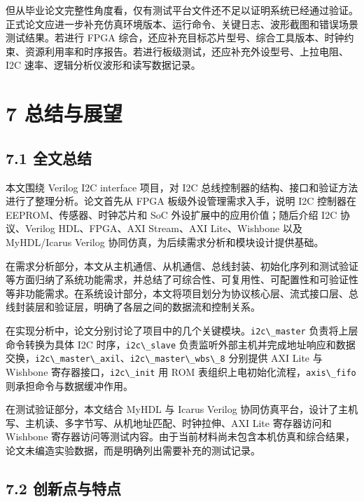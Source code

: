 但从毕业论文完整性角度看，仅有测试平台文件还不足以证明系统已经通过验证。正式论文应进一步补充仿真环境版本、运行命令、关键日志、波形截图和错误场景测试结果。若进行
FPGA
综合，还应补充目标芯片型号、综合工具版本、时钟约束、资源利用率和时序报告。若进行板级测试，还应补充外设型号、上拉电阻、I2C
速率、逻辑分析仪波形和读写数据记录。

\section{7 总结与展望}\label{ux603bux7ed3ux4e0eux5c55ux671b}

\subsection{7.1 全文总结}\label{ux5168ux6587ux603bux7ed3}

本文围绕 Verilog I2C interface 项目，对 I2C
总线控制器的结构、接口和验证方法进行了整理分析。论文首先从 FPGA
板级外设管理需求入手，说明 I2C 控制器在 EEPROM、传感器、时钟芯片和 SoC
外设扩展中的应用价值；随后介绍 I2C 协议、Verilog HDL、FPGA、AXI
Stream、AXI Lite、Wishbone 以及 MyHDL/Icarus Verilog
协同仿真，为后续需求分析和模块设计提供基础。

在需求分析部分，本文从主机通信、从机通信、总线封装、初始化序列和测试验证等方面归纳了系统功能需求，并总结了可综合性、可复用性、可配置性和可验证性等非功能需求。在系统设计部分，本文将项目划分为协议核心层、流式接口层、总线封装层和验证层，明确了各层之间的数据流和控制关系。

在实现分析中，论文分别讨论了项目中的几个关键模块。\passthrough{\lstinline!i2c\_master!}
负责将上层命令转换为具体 I2C 时序，\passthrough{\lstinline!i2c\_slave!}
负责监听外部主机并完成地址响应和数据交换，\passthrough{\lstinline!i2c\_master\_axil!}、\passthrough{\lstinline!i2c\_master\_wbs\_8!}
分别提供 AXI Lite 与 Wishbone
寄存器接口，\passthrough{\lstinline!i2c\_init!} 用 ROM
表组织上电初始化流程，\passthrough{\lstinline!axis\_fifo!}
则承担命令与数据缓冲作用。

在测试验证部分，本文结合 MyHDL 与 Icarus Verilog
协同仿真平台，设计了主机写、主机读、多字节写、从机地址匹配、时钟拉伸、AXI
Lite 寄存器访问和 Wishbone
寄存器访问等测试内容。由于当前材料尚未包含本机仿真和综合结果，论文未编造实验数据，而是明确列出需要补充的测试记录。

\subsection{7.2
创新点与特点}\label{ux521bux65b0ux70b9ux4e0eux7279ux70b9}

